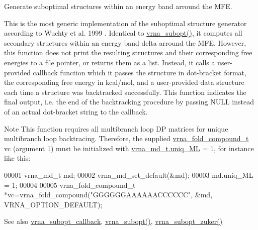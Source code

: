 Generate suboptimal structures within an energy band arround the M\+FE. 

This is the most generic implementation of the suboptimal structure generator according to Wuchty et al. 1999 \cite{wuchty:1999}. Identical to \hyperlink{group__subopt__wuchty_ga0f11d738fb8c8b1885a90c11c8931ff6}{vrna\+\_\+subopt()}, it computes all secondary structures within an energy band {\ttfamily delta} arround the M\+FE. However, this function does not print the resulting structures and their corresponding free energies to a file pointer, or returns them as a list. Instead, it calls a user-\/provided callback function which it passes the structure in dot-\/bracket format, the corresponding free energy in kcal/mol, and a user-\/provided data structure each time a structure was backtracked successfully. This function indicates the final output, i.\+e. the end of the backtracking procedure by passing N\+U\+LL instead of an actual dot-\/bracket string to the callback.

\begin{DoxyNote}{Note}
This function requires all multibranch loop DP matrices for unique multibranch loop backtracing. Therefore, the supplied \hyperlink{group__fold__compound_ga1b0cef17fd40466cef5968eaeeff6166}{vrna\+\_\+fold\+\_\+compound\+\_\+t} {\ttfamily vc} (argument 1) must be initialized with \hyperlink{structvrna__md__s_ade065b814a4e2e72ead93ab502613ed2}{vrna\+\_\+md\+\_\+t.\+uniq\+\_\+\+ML} = 1, for instance like this\+: 
\begin{DoxyCode}
00001 vrna\_md\_t md;
00002 vrna\_md\_set\_default(&md);
00003 md.uniq\_ML = 1;
00004 
00005 vrna\_fold\_compound\_t *vc=vrna\_fold\_compound("GGGGGGAAAAAACCCCCC", &md, VRNA\_OPTION\_DEFAULT);
\end{DoxyCode}

\end{DoxyNote}
\begin{DoxySeeAlso}{See also}
\hyperlink{group__subopt__wuchty_ga226e3803a826aba8159284d021c24d01}{vrna\+\_\+subopt\+\_\+callback}, \hyperlink{group__subopt__wuchty_ga0f11d738fb8c8b1885a90c11c8931ff6}{vrna\+\_\+subopt()}, \hyperlink{group__subopt__zuker_gababde9d210eb433854f1e71da7815fbb}{vrna\+\_\+subopt\+\_\+zuker()} 
\end{DoxySeeAlso}

